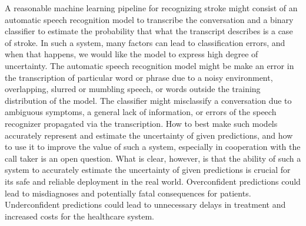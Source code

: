 A reasonable machine learning pipeline for recognizing stroke might consist of an automatic speech recognition model to transcribe the conversation and a binary classifier to estimate the probability that what the transcript describes is a case of stroke. 
In such a system, many factors can lead to classification errors, and when that happens, we would like the model to express high degree of uncertainty. 
The automatic speech recognition model might be make an error in the transcription of particular word or phrase due to a noisy environment, overlapping, slurred or mumbling speech, or words outside the training distribution of the model. 
The classifier might misclassify a conversation due to ambiguous symptoms, a general lack of information, or errors of the speech recognizer propagated via the transcription. 
How to best make such models accurately represent and estimate the uncertainty of given predictions, and how to use it to improve the value of such a system, especially in cooperation with the call taker is an open question.
What is clear, however, is that the ability of such a system to accurately estimate the uncertainty of given predictions is crucial for its safe and reliable deployment in the real world. Overconfident predictions could lead to misdiagnoses and potentially fatal consequences for patients. Underconfident predictions could lead to unnecessary delays in treatment and increased costs for the healthcare system. 








